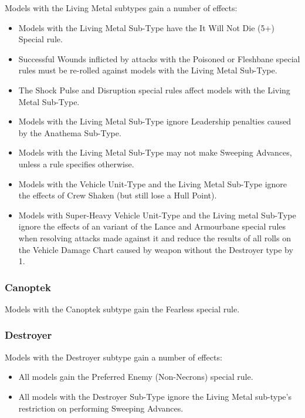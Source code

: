 Models with the Living Metal subtypes gain a number of effects:

\begin{itemize}
	\item Models with the Living Metal Sub-Type have the It Will Not Die (5+) Special rule.
	\item Successful Wounds inflicted by attacks with the Poisoned or Fleshbane special rules must be re-rolled against models with the Living Metal Sub-Type.
	\item The Shock Pulse and Disruption special rules affect models with the Living Metal Sub-Type.
	\item Models with the Living Metal Sub-Type ignore Leadership penalties caused by the Anathema Sub-Type.
	\item Models with the Living Metal Sub-Type may not make Sweeping Advances, unless a rule specifies otherwise.
	\item Models with the Vehicle Unit-Type and the Living Metal Sub-Type ignore the effects of Crew Shaken (but still lose a Hull Point).
	\item Models with Super-Heavy Vehicle Unit-Type and the Living metal Sub-Type ignore the effects of an variant of the Lance and Armourbane special rules when resolving attacks made against it and reduce the results of all rolls on the Vehicle Damage Chart caused by weapon without the Destroyer type by 1.
\end{itemize} 

\subsubsection{Canoptek} \label{Canoptek}

Models with the Canoptek subtype gain the Fearless special rule. \\

\subsubsection{Destroyer} \label{Destroyer}

Models with the Destroyer subtype gain a number of effects:

\begin{itemize}
	\item All models gain the Preferred Enemy (Non-Necrons) special rule.
	\item All models with the Destroyer Sub-Type ignore the Living Metal sub-type's restriction on performing Sweeping Advances. 
\end{itemize}

